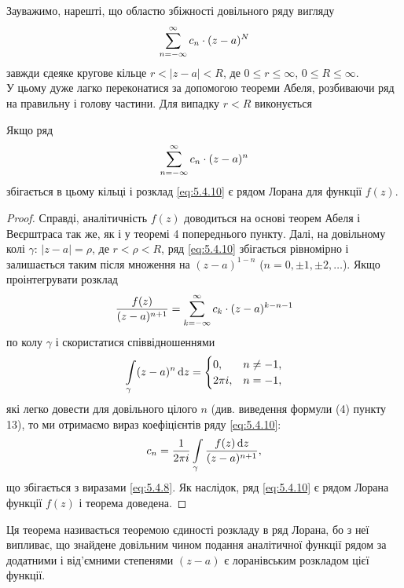 Зауважимо, нарешті, що областю збіжності довільного ряду вигляду
\begin{equation*}
	\displaystyle\sum\limits_{n = -\infty}^\infty c_n \cdot (z - a)^N
\end{equation*}
завжди єдеяке кругове кільце $r < |z - a| < R$, де $0 \le r \le \infty$, $0 \le R \le \infty$. \\

У цьому дуже лагко переконатися за допомогою теореми Абеля, розбиваючи ряд на правильну і голову частини. Для випадку $r < R$ виконується
\begin{theorem}
	Якщо ряд 
	\begin{equation}
		\label{eq:5.4.10}
		\displaystyle\sum\limits_{n = - \infty}^\infty c_n \cdot (z - a)^n
	\end{equation}
	збігається в цьому кільці і розклад \eqref{eq:5.4.10} є рядом Лорана для функції $f(z)$.
\end{theorem}

\begin{proof}
	Справді, аналітичність $f(z)$ доводиться на основі теорем Абеля і Веєрштраса так же, як і у теоремі 4 попереднього пункту. Далі, на довільному колі $\gamma$: $|z - a| = \rho$, де $r < \rho < R$, ряд \eqref{eq:5.4.10} збігається рівномірно і залишається таким після множення на $(z - a)^{1-n}$ ($n = 0, \pm 1, \pm 2, \ldots$). Якщо проінтегрувати розклад 
	\begin{equation*}
		\frac{f(z)}{(z - a)^{n + 1}} = \displaystyle\sum\limits_{k = - \infty}^\infty c_k \cdot (z - a)^{k - n - 1}
	\end{equation*}
	по колу $\gamma$ і скористатися співвідношеннями
	\begin{equation}
		\label{eq:5.4.11}
		\displaystyle\int\limits_\gamma (z - a)^n \mathop{}\!\mathrm{d} z = \begin{cases} 0, & n \ne -1, \\ 2 \pi i, & n = -1, \end{cases}
	\end{equation}
	які легко довести для довільного цілого $n$ (див. виведення формули (4) пункту 13), то ми отримаємо вираз коефіцієнтів ряду \eqref{eq:5.4.10}:
	\begin{equation*}
		c_n = \frac{1}{2 \pi i} \displaystyle\int\limits_\gamma \frac{f(z) \mathop{}\!\mathrm{d} z}{(z - a)^{n + 1}},
	\end{equation*}
	що збігається з виразами \eqref{eq:5.4.8}. Як наслідок, ряд \eqref{eq:5.4.10} є рядом Лорана функції $f(z)$ і теорема доведена.
\end{proof}

Ця теорема називається теоремою єдиності розкладу в ряд Лорана, бо з неї випливає, що знайдене довільним чином подання аналітичної функції рядом за додатними і від'ємними степенями $(z - a)$ є лоранівським розкладом цієї функції.

